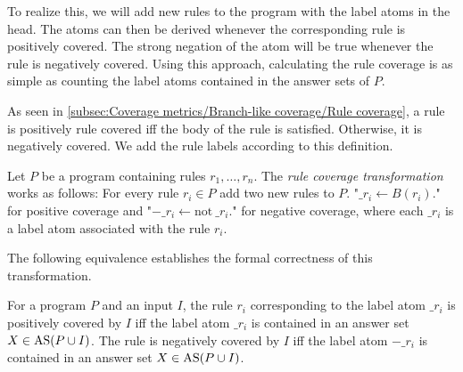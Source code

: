 To realize this, we will add new rules to the program with the label atoms in the head. The atoms can then be derived whenever the corresponding rule is positively covered. The strong negation of the atom will be true whenever the rule is negatively covered. Using this approach, calculating the rule coverage is as simple as counting the label atoms contained in the answer sets of $P$.

As seen in \cref{subsec:Coverage metrics/Branch-like coverage/Rule coverage}, a rule is positively rule covered iff the body of the rule is satisfied. Otherwise, it is negatively covered. We add the rule labels according to this definition.

\begin{definition}
\label{def:rule transformation}
    Let $P$ be a program containing rules \(r_1, \ldots, r_n\). The \emph{rule coverage transformation} works as follows: For every rule \(r_i \in P\) add two new rules to $P$. "\(\_r_i \leftarrow B(r_i).\)" for positive coverage and "\(-\_r_i \leftarrow \text{not}\ \_r_i.\)" for negative coverage, where each $\_r_i$ is a label atom associated with the rule $r_i$.
\end{definition}

The following equivalence establishes the formal correctness of this transformation.
\begin{theorem}
\label{th:rule transformation}
    For a program $P$ and an input $I$, the rule $r_i$ corresponding to the label atom $\_r_i$ is positively covered by $I$ iff the label atom $\_r_i$ is contained in an answer set \(X \in \operatorname{AS}(P \cup I)\). The rule is negatively covered by $I$ iff the label atom $-\_r_i$ is contained in an answer set \(X \in \operatorname{AS}(P \cup I)\).

\end{theorem}


